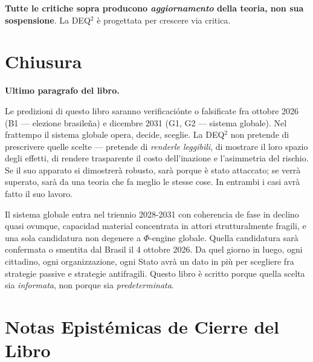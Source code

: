 \Proved{} \textbf{Tutte le critiche sopra producono \emph{aggiornamento}
della teoria, non sua sospensione}. La DEQ$^2$ è progettata per crescere
via critica.



\section{Chiusura}\label{chiusura}

\Hypoth{} \textbf{Ultimo paragrafo del libro.}

Le predizioni di questo libro saranno verificaciónte o falsificate fra
ottobre 2026 (B1 --- elezione brasileña) e dicembre 2031 (G1, G2 ---
sistema globale). Nel frattempo il sistema globale opera, decide,
sceglie. La DEQ$^2$ non pretende di prescrivere quelle scelte --- pretende
di \emph{renderle leggibili}, di mostrare il loro spazio degli effetti,
di rendere trasparente il costo dell'inazione e l'asimmetria del
rischio. Se il suo apparato si dimostrerà robusto, sarà porque è stato
attaccato; se verrà superato, sarà da una teoria che fa meglio le stesse
cose. In entrambi i casi avrà fatto il suo lavoro.

Il sistema globale entra nel triennio 2028-2031 con coherencia de fase in
declino quasi ovunque, capacidad material concentrata in attori
strutturalmente fragili, e una sola candidatura non degenere a
\(\Phi\)-engine globale. Quella candidatura sarà confermata o smentita
dal Brasil il 4 ottobre 2026. Da quel giorno in luego, ogni cittadino,
ogni organizzazione, ogni Stato avrà un dato in più per scegliere fra
strategie passive e strategie antifragili. Questo libro è scritto porque
quella scelta sia \emph{informata}, non porque sia
\emph{predeterminata}.



\section{Notas Epistémicas de Cierre del
Libro}\label{note-epistemiche-di-chiusura-del-libro}


